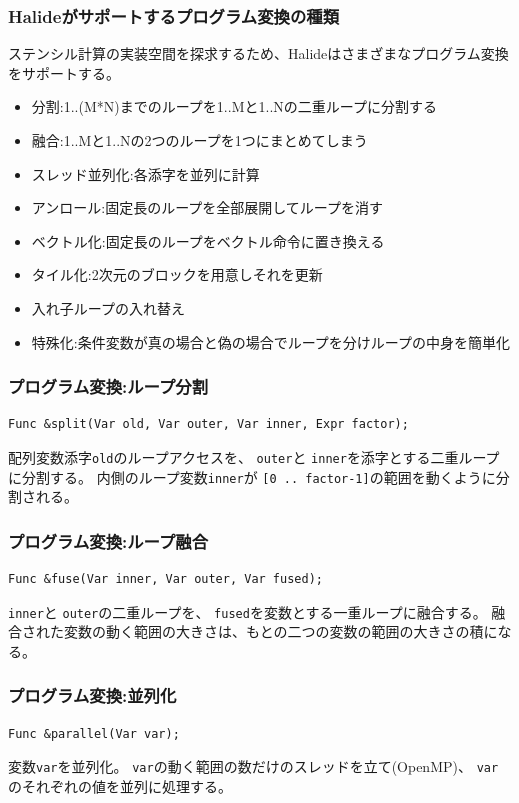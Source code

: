 \documentclass[dvipdfmx,cjk]{beamer}
\begin{document}
\begin{frame}\frametitle{Halideがサポートするプログラム変換の種類}

ステンシル計算の実装空間を探求するため、Halideはさまざまなプログラム変換をサポートする。

\begin{itemize}
  \item 分割:1..(M*N)までのループを1..Mと1..Nの二重ループに分割する
  \item 融合:1..Mと1..Nの2つのループを1つにまとめてしまう
  \item スレッド並列化:各添字を並列に計算
  \item アンロール:固定長のループを全部展開してループを消す
  \item ベクトル化:固定長のループをベクトル命令に置き換える
  \item タイル化:2次元のブロックを用意しそれを更新
  \item 入れ子ループの入れ替え
  \item 特殊化:条件変数が真の場合と偽の場合でループを分けループの中身を簡単化
\end{itemize}
\end{frame}



\begin{frame}[fragile]\frametitle{プログラム変換:ループ分割}

\begin{verbatim}
Func &split(Var old, Var outer, Var inner, Expr factor);
\end{verbatim}

配列変数添字{\tt old}のループアクセスを、
{\tt outer}と
{\tt inner}を添字とする二重ループに分割する。
内側のループ変数{\tt inner}が
{\tt [0 .. factor-1]}の範囲を動くように分割される。
\end{frame}

\begin{frame}[fragile]\frametitle{プログラム変換:ループ融合}


\begin{verbatim}
Func &fuse(Var inner, Var outer, Var fused);
\end{verbatim}

{\tt inner}と
{\tt outer}の二重ループを、
{\tt fused}を変数とする一重ループに融合する。
融合された変数の動く範囲の大きさは、もとの二つの変数の範囲の大きさの積になる。
\end{frame}

\begin{frame}[fragile]\frametitle{プログラム変換:並列化}

\begin{verbatim}
Func &parallel(Var var);
\end{verbatim}

変数{\tt var}を並列化。
{\tt var}の動く範囲の数だけのスレッドを立て(OpenMP)、
{\tt var}のそれぞれの値を並列に処理する。
\end{frame}
\end{document}
